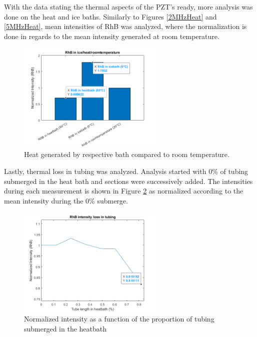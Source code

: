 \documentclass[twoside,twocolumn,9pt,a4paper]{IEEEtran}
\begin{document}
With the data stating the thermal aspects of the PZT's ready, more analysis was done on the heat and ice baths. Similarly to Figures \ref{2MHzHeat} and \ref{5MHzHeat}, mean intensities of RhB was analyzed, where the normalization is done in regards to the mean intensity generated at room temperature.

\begin{figure}[H]
\begin{center}
\includegraphics[width=7cm]{Images/Images from Jonte/RhD in ice.heat,roomtemperature.png} %
\caption{Heat generated by respective bath compared to room temperature.}
\label{RhDIceHeatRoom}
\end{center}
\end{figure} %

Lastly, thermal loss in tubing was analyzed. Analysis started with 0\% of tubing submerged in the heat bath and sections were successively added. The intensities during each measurement is shown in Figure \ref{Tubing} as normalized according to the mean intensity during the 0\% submerge.

\begin{figure}[H]
\begin{center}
\includegraphics[width=7cm]{Images/Images from Jonte/rhd intensity loss in tubing.png} %
\caption{Normalized intensity as a function of the proportion of tubing submerged in the heatbath}
\label{Tubing}
\end{center}
\end{figure} %
\end{document}
